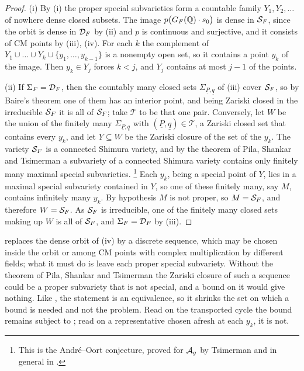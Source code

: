 \begin{proof}
(i) By (i) the proper special subvarieties form a
countable family $Y_{1},Y_{2},\dots$ of nowhere dense closed subsets. The
image $p\bigl(G_{F}(\mathbb{Q})\cdot s_{0}\bigr)$ is dense in $\mathcal{S}_{F}$, since the
orbit is dense in $\mathcal{D}_{F}$ by (ii) and $p$ is
continuous and surjective, and it consists of CM points by
(iii), (iv). For each $k$ the complement of
$Y_{1}\cup\dots\cup Y_{k}\cup\{y_{1},\dots,y_{k-1}\}$ is a nonempty open set,
so it contains a point $y_{k}$ of the image. Then $y_{k}\in Y_{j}$ forces
$k<j$, and $Y_{j}$ contains at most $j-1$ of the points.

(ii) If $\Sigma_{F}=\mathcal{D}_{F}$, then the countably many closed sets
$\Sigma_{\underline{P},\underline{q}}$ of (iii) cover
$\mathcal{S}_{F}$, so by Baire's theorem one of them has an interior point, and being
Zariski closed in the irreducible $\mathcal{S}_{F}$ it is all of $\mathcal{S}_{F}$; take
$\mathcal{T}$ to be that one pair. Conversely, let $W$ be the union of the
finitely many $\Sigma_{\underline{P},\underline{q}}$ with
$(\underline{P},\underline{q})\in\mathcal{T}$, a Zariski closed set that
contains every $y_{k}$, and let $Y\subseteq W$ be the Zariski closure of the
set of the $y_{k}$. The variety $\mathcal{S}_{F}$ is a connected Shimura variety,
and by the theorem of Pila, Shankar and Tsimerman
\cite[Theorem~1.1]{PST} a subvariety of a connected Shimura variety contains
only finitely many maximal special subvarieties.%
\footnote{This is the Andr\'e--Oort conjecture, proved for $\mathcal{A}_{g}$ by
Tsimerman \cite{Tsi18} and in general in \cite{PST}.}
Each $y_{k}$, being a special point of $Y$, lies in a maximal special
subvariety contained in $Y$, so one of these finitely many, say $M$,
contains infinitely many $y_{k}$. By hypothesis $M$ is not proper, so
$M=\mathcal{S}_{F}$, and therefore $W=\mathcal{S}_{F}$. As $\mathcal{S}_{F}$ is irreducible, one of
the finitely many closed sets making up $W$ is all of $\mathcal{S}_{F}$, and
$\Sigma_{F}=\mathcal{D}_{F}$ by (iii).
\end{proof}

\begin{remark}\label{rem:escape}
 replaces the dense orbit of (iv)
by a discrete sequence, which may be chosen inside the orbit or among CM
points with complex multiplication by different fields; what it must do is
leave each proper special subvariety. Without the theorem of Pila, Shankar
and Tsimerman the Zariski closure of such a sequence could be a proper
subvariety that is not special, and a bound on it would give nothing. Like
, the statement is an equivalence, so it shrinks the
set on which a bound is needed and not the problem. Read on the transported
cycle the bound remains subject to ; read on a
representative chosen afresh at each $y_{k}$, it is not.
\end{remark}

